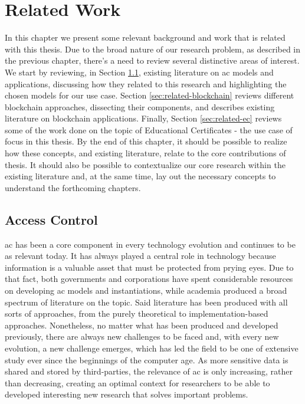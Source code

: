 \chapter{Related Work}
\label{chap:related}

In this chapter we present some relevant background and work that is related with this thesis. Due to the broad nature of our research problem, as described in the previous chapter, there's a need to review several distinctive areas of interest. We start by reviewing, in Section \ref{sec:related-ac}, existing literature on \gls{ac} models and applications, discussing how they related to this research and highlighting the chosen models for our use case. Section \ref{sec:related-blockchain} reviews different blockchain approaches, dissecting their components, and describes existing literature on blockchain applications. Finally, Section \ref{sec:related-ec} reviews some of the work done on the topic of Educational Certificates - the use case of focus in this thesis. By the end of this chapter, it should be possible to realize how these concepts, and existing literature, relate to the core contributions of thesis. It should also be possible to contextualize our core research within the existing literature and, at the same time, lay out the necessary concepts to understand the forthcoming chapters.

\section{Access Control}
\label{sec:related-ac}

\glsdesc{ac} has been a core component in every technology evolution and continues to be as relevant today. It has always played a central role in technology because information is a valuable asset that must be protected from prying eyes. Due to that fact, both governments and corporations have spent considerable resources on developing \gls{ac} models and instantiations, while academia produced a broad spectrum of literature on the topic. Said literature has been produced with all sorts of approaches, from the purely theoretical to implementation-based approaches. Nonetheless, no matter what has been produced and developed previously, there are always new challenges to be faced and, with every new evolution, a new challenge emerges, which has led the field to be one of extensive study ever since the beginnings of the computer age. As more sensitive data is shared and stored by third-parties, the relevance of \gls{ac} is only increasing, rather than decreasing, creating an optimal context for researchers to be able to developed interesting new research that solves important problems.

